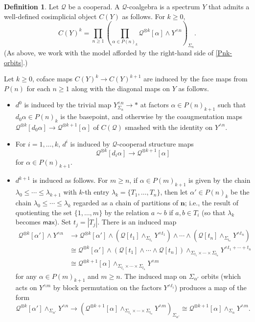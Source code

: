\documentclass[12pt]{amsart}
\theoremstyle{definition}
\newtheorem{definition}[subsection]{Definition}
\theoremstyle{remark}
\newcommand{\pt}{*}
\newcommand{\Cal}[1]{\mathcal{#1}}
\begin{document}
\begin{definition} \label{Q-coalg}
    Let $\Cal{Q}$ be a cooperad. A $\Cal{Q}$-coalgebra is a spectrum $Y$ that admits a well-defined cosimplicial object $C(Y)$ as follows. For $k\geq 0$, \[ C(Y)^k=\prod_{n\geq 1} \left( \prod_{\alpha \in P(n)_k} \Cal{Q}^{\otimes k}[\alpha] \wedge Y^{\wedge n}\right)_{\Sigma_n }.\]
    (As above, we work with the model afforded by the right-hand side of \eqref{Pnk-orbits}.)


Let $k\geq 0$, coface maps $C(Y)^{k}\to C(Y)^{k+1}$ are induced by the face maps from $P(n)$ for each $n\geq 1$ along with the diagonal maps on $Y$ as follows. \begin{itemize}
    \item $d^0$ is induced by the trivial map $Y^{\wedge n}_{\Sigma_n} \to \pt$ at factors $\alpha\in P(n)_{k+1}$ such that $d_0\alpha\in P(n)_{k}$ is the basepoint, and otherwise by the coaugmentation maps $\Cal{Q}^{\otimes k}[d_0\alpha]\to \Cal{Q}^{\otimes k+1}[\alpha]$ of $C(\Cal{Q})$ smashed with the identity on $Y^{\wedge n}$.
    \item For $i=1,\dots,k$, $d^i$ is induced by $\Cal{Q}$-cooperad structure maps \[ \Cal{Q}^{\otimes k}[d_i\alpha]\to \Cal{Q}^{\otimes k+1}[\alpha]\] for $\alpha\in P(n)_{k+1}$.
    \item $d^{k+1}$ is induced as follows. For $m\geq n$, if $\alpha\in P(m)_{k+1}$ is given by the chain $\lambda_0\leq \cdots \leq \lambda_{k+1}$ with $k$-th entry $\lambda_k=\{T_1,\dots,T_n\}$, then let $\alpha'\in P(n)_k$ be the chain $\lambda_0\leq \cdots \leq \lambda_k$ regarded as a chain of partitions of $\mathbf{n}$; i.e., the result of quotienting the set $\{1,\dots,m\}$ by the relation $a\sim b$ if $a,b\in T_i$ (so that $\lambda_k$ becomes $\mathsf{max}$). Set $t_j=|T_j|$. There is an induced map \begin{align*} 
    \Cal{Q}^{\otimes k}[\alpha']\wedge Y^{\wedge n} 
    &
    \to \Cal{Q}^{\otimes k}[\alpha']\wedge (\Cal{Q}[t_1]\wedge_{\Sigma_{t_1}} Y^{\wedge t_1}) \wedge \cdots \wedge (\Cal{Q}[t_n]\wedge_{\Sigma_{t_n}} Y^{\wedge t_n}) 
    \\
    & \cong \Cal{Q}^{\otimes k}[\alpha']\wedge (\Cal{Q}[t_1]\wedge\cdots \wedge \Cal{Q}[t_n]) \wedge_{\Sigma_{t_1}\times\cdots\times \Sigma_{t_n}} Y^{\wedge t_1+\cdots + t_n} \\
    & 
    \cong \Cal{Q}^{\otimes k+1}[\alpha]\wedge_{\Sigma_{t_1}\times\cdots\times\Sigma_{t_n}} Y^{\wedge m}
    \end{align*} for any $\alpha\in P(m)_{k+1}$ and $m\geq n$. The induced map on $\Sigma_{\alpha'}$ orbits (which acts on $Y^{\wedge m}$ by block permutation on the factors $Y^{\wedge t_i}$) produces a map of the form \begin{equation} \label{alpha'alpha}  \Cal{Q}^{\otimes k} [\alpha']\wedge_{\Sigma_{\alpha'}} Y^{\wedge n} \to (\Cal{Q}^{\otimes k+1}[\alpha]\wedge_{\Sigma_{t_1}\times\cdots\times\Sigma_{t_n}} Y^{\wedge m})_{\Sigma_{\alpha'}}\cong\Cal{Q}^{\otimes k+1}[\alpha] \wedge_{\Sigma_{\alpha}} Y^{\wedge m}.\end{equation} 

\end{itemize}
\end{definition}
\end{document}
